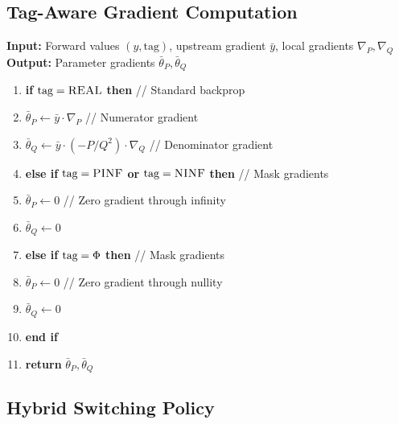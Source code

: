 \documentclass[twoside,11pt]{article}
\newcommand{\trReal}{\textsc{REAL}}
\newcommand{\trPINF}{\textsc{PINF}}
\newcommand{\trNINF}{\textsc{NINF}}
\newcommand{\trPHI}{\textsc{$\Phi$}}
\newcommand{\TAGREAL}{\trReal}
\newcommand{\TAGPINF}{\trPINF}
\newcommand{\TAGNINF}{\trNINF}
\newcommand{\TAGPHI}{\trPHI}
\begin{document}
\subsection{Tag-Aware Gradient Computation}

\begin{tcolorbox}[colback=gray!5!white,colframe=gray!75!black,title=\textbf{Algorithm \refstepcounter{algctr}\thealgctr: Mask-REAL Gradient Computation}]
\label{alg:mask-real-grad}
\textbf{Input:} Forward values $(y, \text{tag})$, upstream gradient $\bar{y}$, local gradients $\nabla_P, \nabla_Q$ \\
\textbf{Output:} Parameter gradients $\bar{\theta}_P, \bar{\theta}_Q$

\begin{enumerate}
\item \textbf{if} $\text{tag} = \TAGREAL$ \textbf{then} \hfill // Standard backprop
\item \quad $\bar{\theta}_P \leftarrow \bar{y} \cdot \nabla_P$ \hfill // Numerator gradient
\item \quad $\bar{\theta}_Q \leftarrow \bar{y} \cdot (-P/Q^2) \cdot \nabla_Q$ \hfill // Denominator gradient
\item \textbf{else if} $\text{tag} = \TAGPINF$ \textbf{or} $\text{tag} = \TAGNINF$ \textbf{then} \hfill // Mask gradients
\item \quad $\bar{\theta}_P \leftarrow 0$ \hfill // Zero gradient through infinity
\item \quad $\bar{\theta}_Q \leftarrow 0$
\item \textbf{else if} $\text{tag} = \TAGPHI$ \textbf{then} \hfill // Mask gradients  
\item \quad $\bar{\theta}_P \leftarrow 0$ \hfill // Zero gradient through nullity
\item \quad $\bar{\theta}_Q \leftarrow 0$
\item \textbf{end if}
\item \textbf{return} $\bar{\theta}_P, \bar{\theta}_Q$
\end{enumerate}
\end{tcolorbox}

\subsection{Hybrid Switching Policy}
\end{document}
